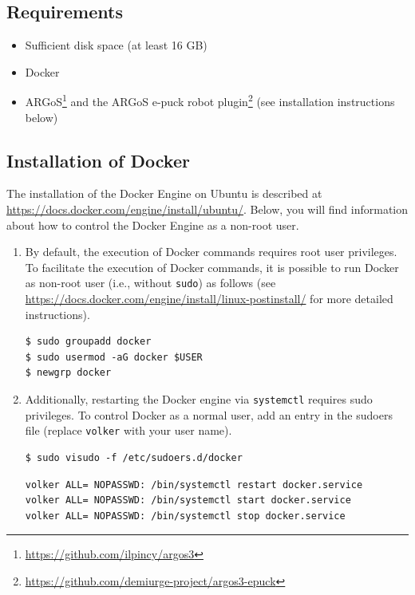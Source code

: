 \documentclass{article}
\begin{document}
\subsection{Requirements}
\begin{itemize}
\item Sufficient disk space (at least 16 GB)
\item Docker 
\item ARGoS\footnote{\url{https://github.com/ilpincy/argos3}} and the
  ARGoS e-puck robot
  plugin\footnote{\url{https://github.com/demiurge-project/argos3-epuck}}
  (see installation instructions below)
\end{itemize}

\subsection{Installation of Docker}

The installation of the Docker Engine on Ubuntu is described at
\url{https://docs.docker.com/engine/install/ubuntu/}. Below, you will
find information about how to control the Docker Engine as a non-root
user.

\begin{enumerate}[leftmargin=*]
\item By default, the execution of Docker commands requires root user
  privileges. To facilitate the execution of Docker commands, it is
  possible to run Docker as non-root user (i.e., without
  \texttt{sudo}) as follows (see
  \url{https://docs.docker.com/engine/install/linux-postinstall/} for
  more detailed instructions).
\begin{verbatim}
$ sudo groupadd docker
$ sudo usermod -aG docker $USER
$ newgrp docker
\end{verbatim}

\item Additionally, restarting the Docker engine via \verb|systemctl|
  requires sudo privileges. To control Docker as a normal user, add an
  entry in the sudoers file (replace \verb|volker| with your user
  name).
\begin{verbatim}
$ sudo visudo -f /etc/sudoers.d/docker
\end{verbatim}
\begin{verbatim}
volker ALL= NOPASSWD: /bin/systemctl restart docker.service
volker ALL= NOPASSWD: /bin/systemctl start docker.service
volker ALL= NOPASSWD: /bin/systemctl stop docker.service
\end{verbatim}
\end{enumerate}
  
\end{document}
